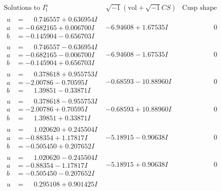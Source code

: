 \documentclass[1p]{elsarticle_modified}
\theoremstyle{definition}
\newcommand{\I}{\sqrt{-1}}
\begin{document}
$$\begin{array}{c|c|c}  
\text{Solutions to }I^u_{1}& \I (\text{vol} + \sqrt{-1}CS) & \text{Cusp shape}\\
 \hline 
\begin{aligned}
u &= \phantom{-}0.746557 + 0.636954 I \\
a &= -0.682165 + 0.006700 I \\
b &= -0.145904 - 0.656703 I\end{aligned}
 & -6.94608 + 1.67535 I & \phantom{-0.000000 } 0 \\ \hline\begin{aligned}
u &= \phantom{-}0.746557 - 0.636954 I \\
a &= -0.682165 - 0.006700 I \\
b &= -0.145904 + 0.656703 I\end{aligned}
 & -6.94608 - 1.67535 I & \phantom{-0.000000 } 0 \\ \hline\begin{aligned}
u &= \phantom{-}0.378618 + 0.955753 I \\
a &= -2.00786 - 0.70595 I \\
b &= \phantom{-}1.39851 - 0.33871 I\end{aligned}
 & -0.68593 - 10.88960 I & \phantom{-0.000000 } 0 \\ \hline\begin{aligned}
u &= \phantom{-}0.378618 - 0.955753 I \\
a &= -2.00786 + 0.70595 I \\
b &= \phantom{-}1.39851 + 0.33871 I\end{aligned}
 & -0.68593 + 10.88960 I & \phantom{-0.000000 } 0 \\ \hline\begin{aligned}
u &= \phantom{-}1.020620 + 0.245504 I \\
a &= -0.88354 + 1.17817 I \\
b &= -0.505450 + 0.207652 I\end{aligned}
 & -5.18915 - 0.90638 I & \phantom{-0.000000 } 0 \\ \hline\begin{aligned}
u &= \phantom{-}1.020620 - 0.245504 I \\
a &= -0.88354 - 1.17817 I \\
b &= -0.505450 - 0.207652 I\end{aligned}
 & -5.18915 + 0.90638 I & \phantom{-0.000000 } 0 \\ \hline\begin{aligned}
u &= \phantom{-}0.295108 + 0.901425 I \\

\end{aligned}
\end{array}$$
\end{document}
